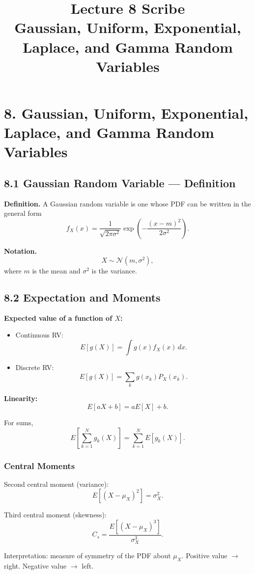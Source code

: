 \documentclass[11pt]{article}
\title{\textbf{Lecture 8 Scribe}\\Gaussian, Uniform, Exponential, Laplace, and Gamma Random Variables}
\date{}
\author{}
\begin{document}
\maketitle

\section*{8. Gaussian, Uniform, Exponential, Laplace, and Gamma Random Variables}

\subsection*{8.1 Gaussian Random Variable — Definition}

\textbf{Definition.}
A Gaussian random variable is one whose PDF can be written in the general form
\[
f_X(x)=\frac{1}{\sqrt{2\pi\sigma^2}}
\exp\!\left(-\frac{(x-m)^2}{2\sigma^2}\right).
\]

\textbf{Notation.}
\[
X\sim \mathcal N(m,\sigma^2),
\]
where $m$ is the mean and $\sigma^2$ is the variance.

\subsection*{8.2 Expectation and Moments}

\textbf{Expected value of a function of $X$:}

\begin{itemize}
\item Continuous RV:
\[
E[g(X)]=\int g(x)f_X(x)\,dx.
\]

\item Discrete RV:
\[
E[g(X)]=\sum_k g(x_k)P_X(x_k).
\]
\end{itemize}

\textbf{Linearity:}
\[
E[aX+b]=aE[X]+b.
\]

For sums,
\[
E\!\left[\sum_{k=1}^{N} g_k(X)\right]
=\sum_{k=1}^{N}E[g_k(X)].
\]

\subsubsection*{Central Moments}

Second central moment (variance):
\[
E[(X-\mu_X)^2]=\sigma_X^2.
\]

Third central moment (skewness):
\[
C_s=\frac{E[(X-\mu_X)^3]}{\sigma_X^3}.
\]

Interpretation: measure of symmetry of the PDF about $\mu_X$.
Positive value $\rightarrow$ right.
Negative value $\rightarrow$ left.
\end{document}
